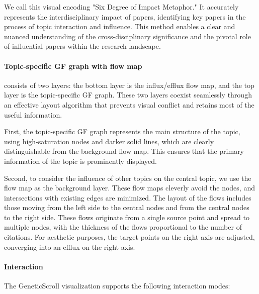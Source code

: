 We call this visual encoding "Six Degree of Impact Metaphor." It accurately represents the interdisciplinary impact of papers, identifying key papers in the process of topic interaction and influence. This method enables a clear and nuanced understanding of the cross-disciplinary significance and the pivotal role of influential papers within the research landscape.

\paragraph{Topic-specific GF graph with flow map} consists of two layers: the bottom layer is the influx/efflux flow map, and the top layer is the topic-specific GF graph. These two layers coexist seamlessly through an effective layout algorithm that prevents visual conflict and retains most of the useful information.

First, the topic-specific GF graph represents the main structure of the topic, using high-saturation nodes and darker solid lines, which are clearly distinguishable from the background flow map. This ensures that the primary information of the topic is prominently displayed.

Second, to consider the influence of other topics on the central topic, we use the flow map as the background layer. These flow maps cleverly avoid the nodes, and intersections with existing edges are minimized. The layout of the flows includes those moving from the left side to the central nodes and from the central nodes to the right side. These flows originate from a single source point and spread to multiple nodes, with the thickness of the flows proportional to the number of citations. For aesthetic purposes, the target points on the right axis are adjusted, converging into an efflux on the right axis.

\paragraph{Interaction}

The GeneticScroll visualization supports the following interaction modes:

